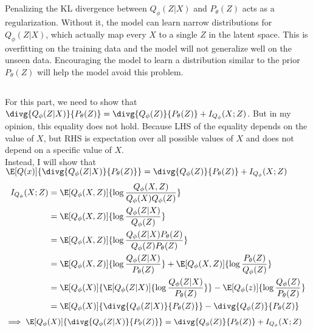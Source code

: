\documentclass{article}
\begin{document}
\subsection{}
Penalizing the KL divergence between \(Q_\phi(Z|X)\) and \(P_\theta(Z)\) acts as a regularization.
Without it, the model can learn narrow distributions for \(Q_\phi(Z|X)\), which actually map every \(X\) to a single \(Z\) in the latent space.
This is overfitting on the training data and the model will not generalize well on the unseen data.
Encouraging the model to learn a distribution similar to the prior \(P_\theta(Z)\) will help the model avoid this problem.

\subsection{}
For this part, we need to show that \(\divg{Q_\phi(Z|X)}{P_\theta(Z)} = \divg{Q_\phi(Z)}{P_\theta(Z)} + I_{Q_\phi}(X; Z)\).
But in my opinion, this equality does not hold.
Because LHS of the equality depends on the value of \(X\), but RHS is expectation over all possible values of \(X\) and does not depend on a specific value of \(X\).\\
Instead, I will show that \(\E[Q(x)]{\divg{Q_\phi(Z|X)}{P_\theta(Z)}} = \divg{Q_\phi(Z)}{P_\theta(Z)} + I_{Q_\phi}(X; Z)\)
\begin{align*}
I_{Q_\phi}(X; Z) &= \E[Q_\phi(X, Z)]{\log \frac{Q_\phi(X, Z)}{Q_\phi(X)Q_\phi(Z)}}\\
&= \E[Q_\phi(X, Z)]{\log \frac{Q_\phi(Z|X)}{Q_\phi(Z)}}\\
&= \E[Q_\phi(X, Z)]{\log \frac{Q_\phi(Z|X)P_\theta(Z)}{Q_\phi(Z)P_\theta(Z)}}\\
&= \E[Q_\phi(X, Z)]{\log \frac{Q_\phi(Z|X)}{P_\theta(Z)}} + \E[Q_\phi(X, Z)]{\log \frac{P_\theta(Z)}{Q_\phi(Z)}}\\
&= \E[Q_\phi(X)]{\E[Q_\phi(Z|X)]{\log \frac{Q_\phi(Z|X)}{P_\theta(Z)}}} - \E[Q_\phi(z)]{\log \frac{Q_\phi(Z)}{P_\theta(Z)}}\\
&= \E[Q_\phi(X)]{\divg{Q_\phi(Z|X)}{P_\theta(Z)}} - \divg{Q_\phi(Z)}{P_\theta(Z)}
\end{align*}
\begin{align*}
\implies \E[Q_\phi(X)]{\divg{Q_\phi(Z|X)}{P_\theta(Z)}} &= \divg{Q_\phi(Z)}{P_\theta(Z)} + I_{Q_\phi}(X; Z)
\end{align*}
\end{document}
